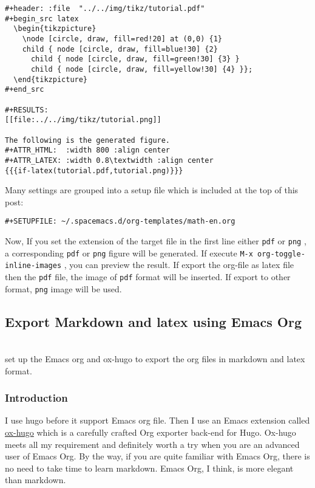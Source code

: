\documentclass[koma,a4paper,captions=tableheading,11pt,listings-sv,microtype,paralist,colorlinks=true,urlcolor=blue,palatino]{org-article}
\begin{document}
\begin{verbatim}
#+header: :file  "../../img/tikz/tutorial.pdf"
#+begin_src latex
  \begin{tikzpicture}
    \node [circle, draw, fill=red!20] at (0,0) {1}
    child { node [circle, draw, fill=blue!30] {2}
      child { node [circle, draw, fill=green!30] {3} }
      child { node [circle, draw, fill=yellow!30] {4} }};
  \end{tikzpicture}
#+end_src

#+RESULTS:
[[file:../../img/tikz/tutorial.png]]

The following is the generated figure.
#+ATTR_HTML:  :width 800 :align center
#+ATTR_LATEX: :width 0.8\textwidth :align center
{{{if-latex(tutorial.pdf,tutorial.png)}}}
\end{verbatim}

Many settings are grouped into a setup file which is included at the top of this
post:
\begin{verbatim}
#+SETUPFILE: ~/.spacemacs.d/org-templates/math-en.org
\end{verbatim}

Now, If you set the extension of the target file in the first line either \texttt{pdf} or
\texttt{png} , a corresponding \texttt{pdf} or \texttt{png} figure will be generated. If execute \texttt{M-x
org-toggle-inline-images}  , you can preview the result. If export the org-file
as latex file then the \texttt{pdf} file, the image of \texttt{pdf} format will be inserted. If
export to other format, \texttt{png} image will be used.



\subsection{Export Markdown and latex using Emacs Org}
\label{sec:orgb25f912}


\hspace{0pt}\\


set up the Emacs org and ox-hugo to export the org files in markdown and latex format.


\subsubsection{Introduction}
\label{sec:org1a16d6f}


I use hugo before it support Emacs org file. Then I use an Emacs extension
called \href{https://github.com/kaushalmodi/ox-hugo}{ox-hugo} which is a carefully crafted Org exporter back-end for Hugo.
Ox-hugo meets all my requirement and definitely worth a try when you are an
advanced user of Emacs Org. By the way, if you are quite familiar with Emacs
Org, there is no need to take time to learn markdown. Emacs Org, I think, is
more elegant than markdown.
\end{document}
